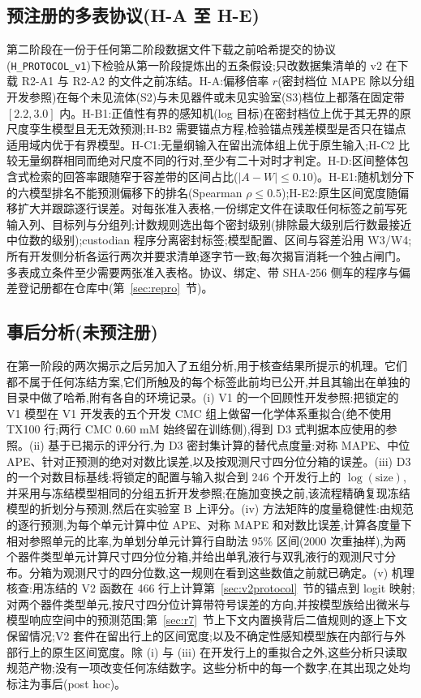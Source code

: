 \documentclass[11pt,a4paper]{ctexart}
\begin{document}
\subsection{预注册的多表协议(H-A 至 H-E)}
\label{sec:hprotocol}
第二阶段在一份于任何第二阶段数据文件下载之前哈希提交的协议(\texttt{H\_PROTOCOL\_v1})下检验从第一阶段提炼出的五条假设;只改数据集清单的 v2 在下载 R2-A1 与 R2-A2 的文件之前冻结。H-A:偏移倍率 $r$(密封档位 MAPE 除以分组开发参照)在每个未见流体(S2)与未见器件或未见实验室(S3)档位上都落在固定带 $[2.2, 3.0]$ 内。\mbox{H-B1}:正值性有界的感知机(log 目标)在密封档位上优于其无界的原尺度孪生模型且无无效预测;\mbox{H-B2} 需要锚点方程,检验锚点残差模型是否只在锚点适用域内优于有界模型。\mbox{H-C1}:无量纲输入在留出流体组上优于原生输入;\mbox{H-C2} 比较无量纲群相同而绝对尺度不同的行对,至少有二十对时才判定。H-D:区间整体包含式检索的回答率跟随窄于容差带的区间占比($|A-W|\le 0.10$)。\mbox{H-E1}:随机划分下的六模型排名不能预测偏移下的排名(Spearman $\rho\le 0.5$);\mbox{H-E2}:原生区间宽度随偏移扩大并跟踪逐行误差。对每张准入表格,一份绑定文件在读取任何标签之前写死输入列、目标列与分组列;计数规则选出每个密封级别(排除最大级别后行数最接近中位数的级别);custodian 程序分离密封标签;模型配置、区间与容差沿用 W3/W4;所有开发侧分析各运行两次并要求清单逐字节一致;每次揭盲消耗一个独占闸门。多表成立条件至少需要两张准入表格。协议、绑定、带 SHA-256 侧车的程序与偏差登记册都在仓库中(第~\ref{sec:repro}~节)。

\subsection{事后分析(未预注册)}
\label{sec:posthoc}

在第一阶段的两次揭示之后另加入了五组分析,用于核查结果所提示的机理。它们都不属于任何冻结方案,它们所触及的每个标签此前均已公开,并且其输出在单独的目录中做了哈希,附有各自的环境记录。(i) V1 的一个回顾性开发参照:把锁定的 V1 模型在 V1 开发表的五个开发 CMC 组上做留一化学体系重拟合(绝不使用 TX100 行;两行 CMC 0.60 mM 始终留在训练侧),得到 D3 式判据本应使用的参照。(ii) 基于已揭示的评分行,为 D3 密封集计算的替代点度量:对称 MAPE、中位 APE、针对正预测的绝对对数比误差,以及按观测尺寸四分位分箱的误差。(iii) D3 的一个对数目标基线:将锁定的配置与输入拟合到 246 个开发行上的 $\log(\mathrm{size})$,并采用与冻结模型相同的分组五折开发参照;在施加变换之前,该流程精确复现冻结模型的折划分与预测,然后在实验室 B 上评分。(iv) 方法矩阵的度量稳健性:由规范的逐行预测,为每个单元计算中位 APE、对称 MAPE 和对数比误差,计算各度量下相对参照单元的比率,为单划分单元计算行自助法 95\% 区间(2000 次重抽样),为两个器件类型单元计算尺寸四分位分箱,并给出单乳液行与双乳液行的观测尺寸分布。分箱为观测尺寸的四分位数,这一规则在看到这些数值之前就已确定。(v) 机理核查:用冻结的 V2 函数在 466 行上计算第~\ref{sec:v2protocol}~节的锚点到 logit 映射;对两个器件类型单元,按尺寸四分位计算带符号误差的方向,并按模型族给出微米与模型响应空间中的预测范围;第~\ref{sec:r7}~节上下文内置换背后二值规则的逐上下文保留情况;V2 套件在留出行上的区间宽度;以及不确定性感知模型族在内部行与外部行上的原生区间宽度。除 (i) 与 (iii) 在开发行上的重拟合之外,这些分析只读取规范产物;没有一项改变任何冻结数字。这些分析中的每一个数字,在其出现之处均标注为事后(post hoc)。
\end{document}
